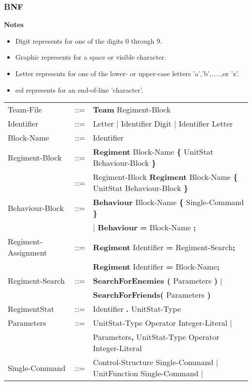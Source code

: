 	\subsubsection{BNF}
		{\bf Notes}
		\begin{itemize}
			\item Digit represents for one of the digits 0 through 9.
			\item Graphic represents for a space or visible character.
			\item Letter represents for one of the lower- or upper-case letters 'a','b',.....,or 'z'.
			\item eol represents for an end-of-line 'character'.
		\end{itemize}
		\begin{center}
				\begin{longtable}{l l l}
				\endfirsthead
				\endhead
				Team-File		   &	::=	 & {\bf Team} Regiment-Block \\
				Identifier		   &    ::=  & Letter $\mid$ Identifier Digit $\mid$ Identifier Letter \\
				Block-Name		   &	::=  & Identifier							\\
				Regiment-Block     &	::=	 & {\bf Regiment} Block-Name {\bf \{ } UnitStat Behaviour-Block \bf{\} }\\
								   &	::=	 & Regiment-Block {\bf Regiment} Block-Name {\bf \{ } UnitStat Behaviour-Block \bf{\} }\\
				Behaviour-Block	   &	::=	 & {\bf Behaviour} Block-Name {\bf \{} Single-Command {\bf \}}  \\
								   &         & $\mid$ {\bf Behaviour} {\bf = } Block-Name {\bf ;} \\
				Regiment-Assignment&    ::=  &{\bf Regiment} Identifier {\bf =} Regiment-Search{\bf ;}\\
								   &         &{\bf Regiment} Identifier {\bf =} Block-Name{\bf ;}\\
				Regiment-Search	   &	::=	 &{\bf SearchForEnemies (} Parameters {\bf )} $\mid$\\
								   &		 & {\bf SearchForFriends(} Parameters {\bf )}	 \\
				RegimentStat 	   &	::=  & Identifier {\bf.} UnitStat-Type \\
				Parameters		   &	::=	 & UnitStat-Type Operator Integer-Literal $\mid$\\
								   &		 & Parameters{\bf ,} UnitStat-Type Operator Integer-Literal\\
				Single-Command     &	::=  & Control-Structure Single-Command $\mid$ UnitFunction Single-Command $\mid$ \\

\end{longtable}
\end{center}

